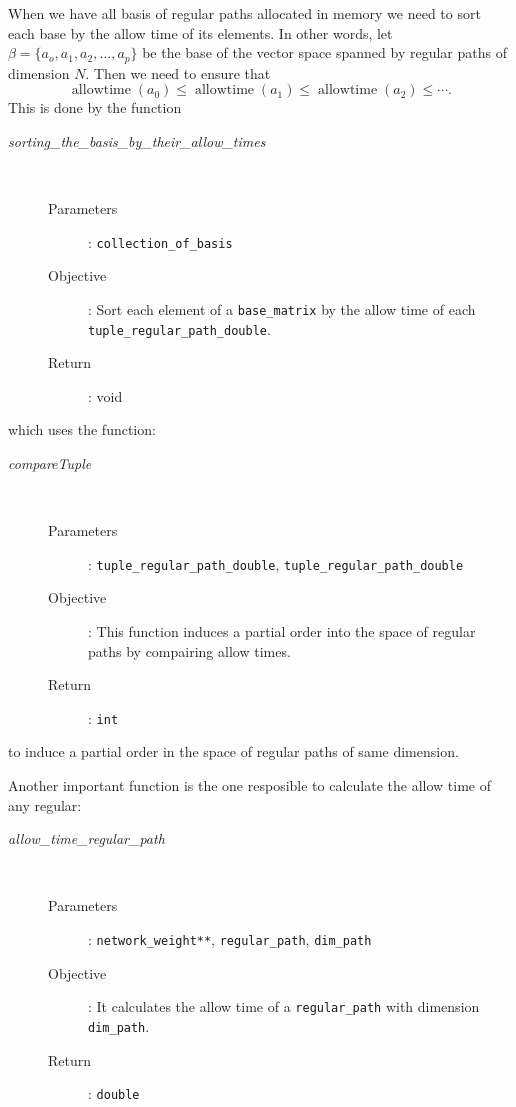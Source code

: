 \documentclass[11pt,a4paper]{article}
\DeclareMathOperator{\allowtime}{allow time}
\begin{document}
When we have all basis of regular paths allocated in memory we need to sort each base
by the allow time of its elements. In other words, let $\beta = \{a_o, a_1, a_2, \ldots, a_p\}$
be the base of the vector space spanned by regular paths of dimension $N$. Then we need
to ensure that
\[
	\allowtime(a_0) \leq \allowtime(a_1) \leq \allowtime(a_2) \leq \cdots.
\]
This is done by the function
\begin{description}
	\item [\textit{sorting\_the\_basis\_by\_their\_allow\_times}] \hfill \\[-0.5cm]
		\begin{description}
			\item [Parameters]: \texttt{collection\_of\_basis}
			\item [Objective]: Sort each element of a \texttt{base\_matrix} by
				the allow time of each \texttt{tuple\_regular\_path\_double}.
			\item [Return]: void
		\end{description}
\end{description}
which uses the function:
\begin{description}
	\item [\textit{compareTuple}] \hfill \\[-0.5cm]
		\begin{description}
			\item [Parameters]: \texttt{tuple\_regular\_path\_double},
				\texttt{tuple\_regular\_path\_double}
			\item [Objective]: This function induces a partial order into the space of
				regular paths by compairing allow times.
			\item [Return]: \texttt{int}
		\end{description}
\end{description}
to induce a partial order in the space of regular paths of same dimension.

Another important function is the one resposible to calculate the allow time of any
regular:
\begin{description}
	\item [\textit{allow\_time\_regular\_path}] \hfill \\[-0.5cm]
		\begin{description}
			\item [Parameters]: \texttt{network\_weight**},
				\texttt{regular\_path}, \texttt{dim\_path}
			\item [Objective]: It calculates the allow time of a \texttt{regular\_path} with
				dimension \texttt{dim\_path}.
			\item [Return]: \texttt{double}
		\end{description}
\end{description}
\end{document}
